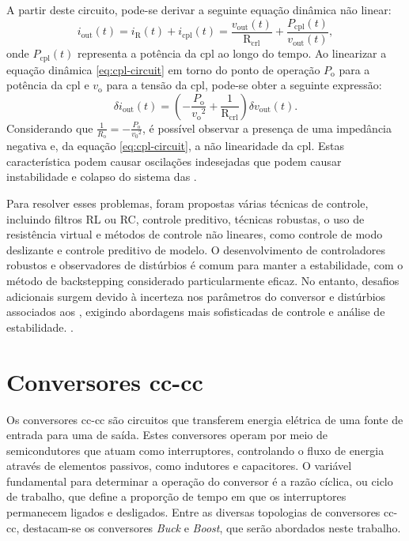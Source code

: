 \noindent A partir deste circuito, pode-se derivar a seguinte equação dinâmica não linear: \begin{equation} i_{\mathrm{out}}(t) = i_{\mathrm{R}}(t) + i_{\mathrm{cpl}}(t) = \frac{v_{\mathrm{out}}(t)}{\mathrm{R_{crl}}} + \frac{{P_{\mathrm{cpl}}(t)}}{v_{\mathrm{out}}(t)} \label{eq:cpl-circuit},\end{equation} onde $P_{\mathrm{cpl}}(t)$ representa a potência da \acrshort{cpl} ao longo do tempo. Ao linearizar a equação dinâmica \eqref{eq:cpl-circuit} em torno do ponto de operação $P_{\mathrm{o}}$ para a potência da \acrshort{cpl} e $v_{\mathrm{o}}$ para a tensão da \acrshort{cpl}, pode-se obter a seguinte expressão: \begin{equation} \delta i_{\mathrm{out}}(t) = \left(- \frac{P_{\mathrm{o}}}{{v_{\mathrm{o}}}^2} + \frac{1}{\mathrm{R_{crl}}} \right) \delta v_{\mathrm{out}}(t). \end{equation} Considerando que $ \displaystyle \frac{1}{R_{\mathrm{o}}} = - \frac{P_{\mathrm{o}}}{{v_0}^2}$, é possível observar a presença de uma impedância negativa e, da equação \eqref{eq:cpl-circuit}, a não linearidade da \acrshort{cpl}. Estas característica podem causar oscilações indesejadas que podem causar instabilidade e colapso do sistema das  \citep{Bessa2020, Amiri2020}.

Para resolver esses problemas, foram propostas várias técnicas de controle, incluindo filtros RL ou RC, controle preditivo, técnicas robustas, o uso de resistência virtual e métodos de controle não lineares, como controle de modo deslizante e controle preditivo de modelo. O desenvolvimento de controladores robustos e observadores de distúrbios é comum para manter a estabilidade, com o método de backstepping considerado particularmente eficaz. No entanto, desafios adicionais surgem devido à incerteza nos parâmetros do conversor e distúrbios associados aos , exigindo abordagens mais sofisticadas de controle e análise de estabilidade. \citep{Bessa2020, Amiri2020}.

\section{Conversores \acrshort{cc}-\acrshort{cc}}

Os conversores \acrshort{cc}-\acrshort{cc} são circuitos que transferem energia elétrica de uma fonte de entrada para uma de saída. Estes conversores operam por meio de semicondutores que atuam como interruptores, controlando o fluxo de energia através de elementos passivos, como indutores e capacitores. O variável fundamental para determinar a operação do conversor é a razão cíclica, ou ciclo de trabalho, que define a proporção de tempo em que os interruptores permanecem ligados e desligados. Entre as diversas topologias de conversores \acrshort{cc}-\acrshort{cc}, destacam-se os conversores \textit{Buck} e \textit{Boost}, que serão abordados neste trabalho.

